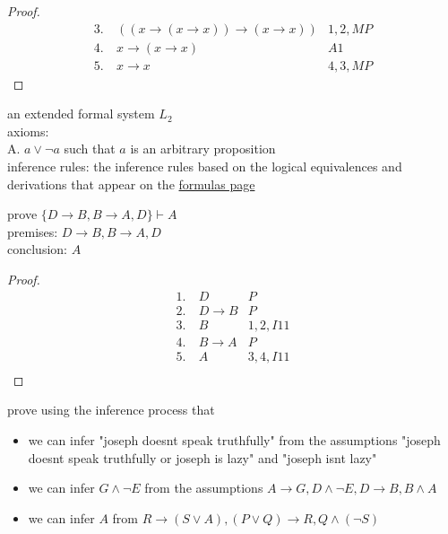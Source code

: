 \documentclass[a4paper,12pt]{article}
\begin{document}
\begin{definition}
\begin{my_example}
\begin{proof}
\begin{align*}
  3.\ & ((x \to (x \to x)) \to (x \to x)) & 1,2,MP\\
  4.\ & x \to (x \to x) & A1\\
  5.\ & x \to x & 4,3,MP
\end{align*}
\end{proof}
\end{my_example}
\begin{my_example}
an extended formal system \(L_2\)\\[0pt]
axioms:\\[0pt]
A. \(a \lor \lnot a\) such that \(a\) is an arbitrary proposition\\[0pt]
inference rules:  the inference rules based on the logical equivalences and derivations that appear on the \href{20230525082155-logic_formulas.org}{formulas page}\\[0pt]
\begin{subquestion}
prove \(\{D \to B, B \to A, D\} \vdash A\)\\[0pt]
premises: \(D \to B, B \to A, D\)\\[0pt]
conclusion: \(A\)\\[0pt]
\begin{proof}
\begin{align*}
  1.\ & D & P\\
  2.\ & D \to B & P\\
  3.\ & B & 1,2,I11\\
  4.\ & B \to A & P\\
  5.\ & A & 3,4,I11\\
\end{align*}
\end{proof}
\end{subquestion}
\begin{subquestion}
prove using the inference process that\\[0pt]
\begin{itemize}
\item we can infer "joseph doesnt speak truthfully" from the assumptions "joseph doesnt speak truthfully or joseph is lazy" and "joseph isnt lazy"\\[0pt]
\item we can infer \(G \land \lnot E\) from the assumptions \(A \to G, D \land \lnot E, D \to B, B \land A\)\\[0pt]
\item we can infer \(A\) from \(R \to (S \lor A), (P \lor Q) \to R, Q \land (\lnot S)\)\\[0pt]
\end{itemize}
\end{subquestion}
\end{my_example}
\end{definition}
\end{document}
